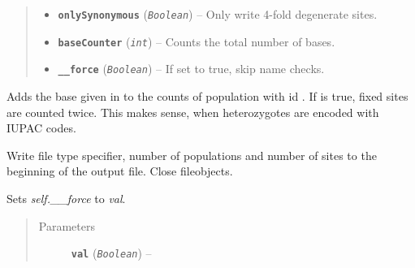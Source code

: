 \documentclass[letterpaper,10pt,english]{sphinxmanual}
\begin{document}
\begin{fulllineitems}
\begin{quote}
\begin{description}
\begin{itemize}
\item {} 
\textbf{\texttt{onlySynonymous}} (\emph{\texttt{Boolean}}) -- Only write 4-fold degenerate sites.

\item {} 
\textbf{\texttt{baseCounter}} (\emph{\texttt{int}}) -- Counts the total number of bases.

\item {} 
\textbf{\texttt{\_\_force}} (\emph{\texttt{Boolean}}) -- If set to true, skip name checks.

\end{itemize}

\end{description}\end{quote}

\begin{fulllineitems}
\label{cf:libPoMo.cf.CFWriter.add_base_to_sequence}
Adds the base given in  to the counts of population with
id .  If  is true, fixed sites are
counted twice.  This makes sense, when heterozygotes are
encoded with IUPAC codes.

\end{fulllineitems}


\begin{fulllineitems}
\label{cf:libPoMo.cf.CFWriter.close}
Write file type specifier, number of populations and number of
sites to the beginning of the output file.  Close
fileobjects.

\end{fulllineitems}


\begin{fulllineitems}
\label{cf:libPoMo.cf.CFWriter.set_force}
Sets \emph{self.\_\_force} to \emph{val}.
\begin{quote}\begin{description}
\item[{Parameters}] \leavevmode
\textbf{\texttt{val}} (\emph{\texttt{Boolean}}) -- 


\end{description}
\end{quote}
\end{fulllineitems}
\end{fulllineitems}
\end{document}
